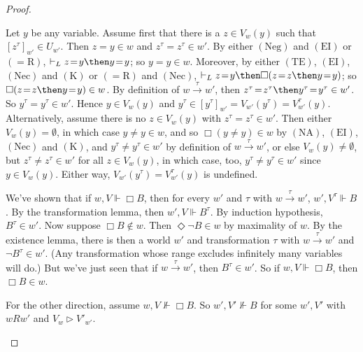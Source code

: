 \documentclass[11pt]{woarticle}
\newcommand{\cmnt}[1]{\iffalse #1 \fi}
\theoremstyle{break}
\theoremstyle{nonumberplain}
\newcommand{\SAT}{\Vdash}
\newcommand{\Img}{\triangleright}
\newcommand{\1}{\;\,|\;\,}
\newcommand{\T}[1]{\ensuremath{(\mathrm{ #1})}}
\begin{document}
\begin{proof}
\begin{enumerate}
    Let $y$ be any variable. Assume first that there is a $z \in
    V_w(y)$ such that $[z^\tau]_{w'} \in U_{w'}$. Then $z\!=\!y \in w$
    and $z^{\tau}\!=\!z^{\tau} \in w'$. By either \T{Neg} and \T{EI}
    or \T{=\!R}, $\vdash_L z\!=\!y \then y\!=\!y$; so $y\!=\!y \in
    w$. Moreover, by either \T{TE}, \T{EI}, \T{Nec} and \T{K} or
    \T{=\!R} and \T{Nec}, $\vdash_L z\!=\!y \then \Box(z\!=\!z \then
    y\!=\!y)$; so $\Box(z\!=\!z \then y\!=\!y) \in w$. By definition
    of $w\xrightarrow{\tau}w'$, then $z^\tau\!=\!z^\tau \then
    y^\tau\!=\!y^\tau \in w'$. So $y^\tau\!=y^\tau \in w'$. Hence $y
    \in V_w(y)$ and $y^\tau \in [y^\tau]_{w'} = V_{w'}(y^\tau) =
    V^\tau_{w'}(y)$.  Alternatively, assume there is no $z \in V_w(y)$
    with $z^{\tau}\!=\!z^{\tau} \in w'$. Then either $V_w(y) =
    \emptyset$, in which case $y\!\not=\!y \in w$, and so
    $\Box(y\!\not=\!y) \in w$ by \T{NA}, \T{EI}, \T{Nec} and \T{K},
    and $y^\tau\!\not=\!y^\tau \in w'$ by definition of
    $w\xrightarrow{\tau}w'$, or else $V_w(y) \not= \emptyset$, but
    $z^{\tau}\!\not=\!z^{\tau} \in w'$ for all $z \in V_w(y)$, in
    which case, too, $y^\tau\!\not=\!y^\tau \in w'$ since $y \in
    V_w(y)$. Either way, $V_{w'}(y^\tau) = V^\tau_{w'}(y)$ is
    undefined.

    We've shown that if $w,V \SAT \Box B$, then for every $w'$ and
    $\tau$ with $w\xrightarrow{\tau} w'$, $w',V^{\tau} \SAT B$. By the
    transformation lemma, then $w',V \SAT B^\tau$. By induction
    hypothesis, $B^{\tau} \in w'$. Now suppose $\Box B \not\in
    w$. Then $\Diamond \neg B \in w$ by maximality of $w$. By the
    existence lemma, there is then a world $w'$ and transformation
    $\tau$ with $w\xrightarrow{\tau}w'$ and $\neg B^{\tau} \in
    w'$. (Any transformation whose range excludes infinitely many
    variables will do.) But we've just seen that if
    $w\xrightarrow{\tau}w'$, then $B^\tau \in w'$. So if $w,V \SAT
    \Box B$, then $\Box B \in w$.

    For the other direction, assume $w,V \not\SAT \Box B$. So $w',V'
    \not\SAT B$ for some $w',V'$ with $wRw'$ and $V_w \Img V'_{w'}$.%
    \cmnt{%

      It may help to run through a simplified version of the proof
      first, assuming that $B$ contains a single free variable $x$ and
      ignoring negative logics. So we assume that $w,V \SAT \Diamond
      \neg B(x)$, and hence $w',V' \SAT \neg B(x)$ for suitable
      $w',V'$. If $V'$ were $V^\tau$ for $\tau: w \xrightarrow{\tau}
      w'$, things would be easy: suppose for reductio that
      $\Diamond\neg B(x) \not\in w$ and so $\Box B(x) \in w$; then
      $B(x^\tau)\in w'$ for all $w': w\xrightarrow{\tau} w'$, and by
      i.h., $w',V^\tau \SAT B(x)$ -- contradiction. But $V'$ may not
      be $V^\tau$, i.e.\ $V'_{w'}(x)$ may not be
      $V^\tau_{w'}(x)$. What we do know is that there is some
      ``guise'' of $x$ at $w$, i.e.\ some variable $y$ with $x\!=\!y
      \in w$ for which $V'_{w'}(x) = [y^\tau]_{w'}$. Moreover,
      $[y^\tau]_{w'} = V_{w'}(y^\tau) = V_{w'}^\tau(y) = V^{\tau \cdot
        [y/x]}_{w'}(x)$. So we can think of $V'$ as $V^{\tau\cdot
        [y/x]}$.
      
}
\end{enumerate}
\end{proof}
\end{document}
